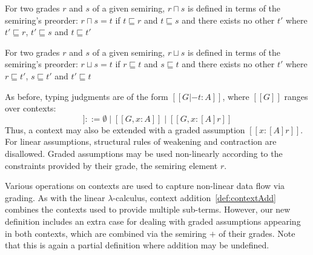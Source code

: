 \begin{definition}
  \label{def:glb}
  For two grades $r$ and $s$ of a given semiring, $r \sqcap s$ is defined in
  terms of the semiring's preorder: $r \sqcap s = t$ if $t \sqsubseteq r$ and $ 
  t \sqsubseteq s$ and there exists no other $t'$ where $t' \sqsubseteq r$,  
  $t' \sqsubseteq s$ and $ t \sqsubseteq t'$
\end{definition}

\begin{definition}
  \label{def:def-lub}
  For two grades $r$ and $s$ of a given semiring, $r \sqcup s$ is defined in
  terms of the semiring's preorder: $r \sqcup s = t$ if $r \sqsubseteq t$ and $ 
  s \sqsubseteq t$ and there exists no other $t'$ where $r \sqsubseteq t'$, 
  $s \sqsubseteq t'$ and $t' \sqsubseteq t$
\end{definition}

As before, typing judgments are of the form $[[ G |- t : A ]]$, where $[[ G ]]$
ranges over contexts:
\begin{equation*}
  [[ G ]] ::= \emptyset
  \mid [[ G , x : A ]]
  \mid [[ G , x : [ A ] r ]]
\tag{contexts}
\end{equation*}
Thus, a context may also be extended with a graded assumption $[[x : [A] r]]$.
For linear assumptions, structural rules of weakening and contraction are
disallowed. Graded assumptions may be used non-linearly according to the
constraints provided by their grade, the semiring element $r$. 

Various operations on contexts are used to capture non-linear data flow via
grading. As with the linear $\lambda$-calculus, context
addition~\eqref{def:contextAdd} combines the contexts used to provide multiple
sub-terms. However, our new definition includes an extra case for dealing with
graded assumptions appearing in both contexts, which are combined
via the semiring $+$ of their grades. Note that this is again a partial definition
where addition may be undefined.

